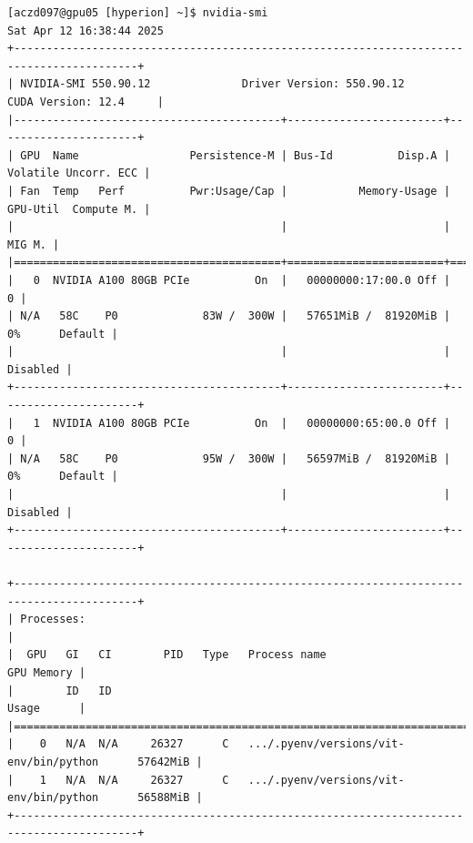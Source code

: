 \begin{verbatim}
[aczd097@gpu05 [hyperion] ~]$ nvidia-smi
Sat Apr 12 16:38:44 2025       
+-----------------------------------------------------------------------------------------+
| NVIDIA-SMI 550.90.12              Driver Version: 550.90.12      CUDA Version: 12.4     |
|-----------------------------------------+------------------------+----------------------+
| GPU  Name                 Persistence-M | Bus-Id          Disp.A | Volatile Uncorr. ECC |
| Fan  Temp   Perf          Pwr:Usage/Cap |           Memory-Usage | GPU-Util  Compute M. |
|                                         |                        |               MIG M. |
|=========================================+========================+======================|
|   0  NVIDIA A100 80GB PCIe          On  |   00000000:17:00.0 Off |                    0 |
| N/A   58C    P0             83W /  300W |   57651MiB /  81920MiB |      0%      Default |
|                                         |                        |             Disabled |
+-----------------------------------------+------------------------+----------------------+
|   1  NVIDIA A100 80GB PCIe          On  |   00000000:65:00.0 Off |                    0 |
| N/A   58C    P0             95W /  300W |   56597MiB /  81920MiB |      0%      Default |
|                                         |                        |             Disabled |
+-----------------------------------------+------------------------+----------------------+
                                                                                         
+-----------------------------------------------------------------------------------------+
| Processes:                                                                              |
|  GPU   GI   CI        PID   Type   Process name                              GPU Memory |
|        ID   ID                                                               Usage      |
|=========================================================================================|
|    0   N/A  N/A     26327      C   .../.pyenv/versions/vit-env/bin/python      57642MiB |
|    1   N/A  N/A     26327      C   .../.pyenv/versions/vit-env/bin/python      56588MiB |
+-----------------------------------------------------------------------------------------+

\end{verbatim}



